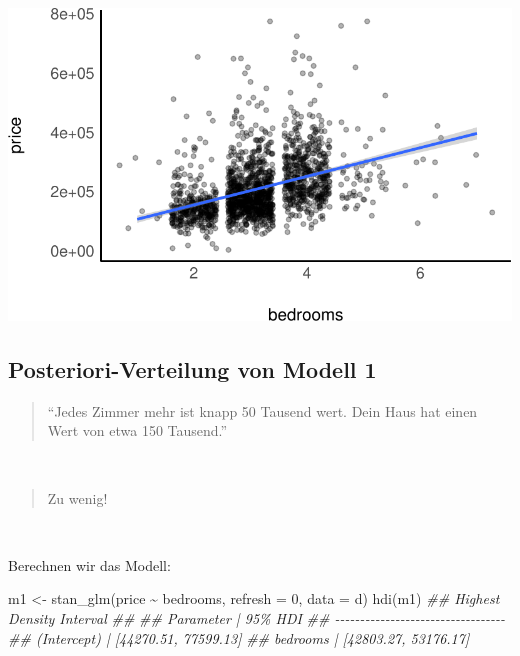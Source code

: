 \documentclass[
  a4paper,
  DIV=11]{scrreprt}
\newenvironment{Shaded}{\begin{snugshade}}{\end{snugshade}}
\newcommand{\AttributeTok}[1]{\textcolor[rgb]{0.40,0.45,0.13}{#1}}
\newcommand{\DecValTok}[1]{\textcolor[rgb]{0.68,0.00,0.00}{#1}}
\newcommand{\DocumentationTok}[1]{\textcolor[rgb]{0.37,0.37,0.37}{\textit{#1}}}
\newcommand{\FunctionTok}[1]{\textcolor[rgb]{0.28,0.35,0.67}{#1}}
\newcommand{\NormalTok}[1]{\textcolor[rgb]{0.00,0.23,0.31}{#1}}
\newcommand{\OtherTok}[1]{\textcolor[rgb]{0.00,0.23,0.31}{#1}}
\newcommand{\SpecialCharTok}[1]{\textcolor[rgb]{0.37,0.37,0.37}{#1}}
\theoremstyle{definition}
\theoremstyle{remark}
\begin{document}
\includegraphics{./kausal_files/figure-pdf/d-plot-don1-1.pdf}

\hypertarget{posteriori-verteilung-von-modell-1}{%
\subsection{Posteriori-Verteilung von Modell
1}\label{posteriori-verteilung-von-modell-1}}

\begin{quote}
``Jedes Zimmer mehr ist knapp 50 Tausend wert. Dein Haus hat einen Wert
von etwa 150 Tausend.''
\end{quote}

👩

\begin{quote}
Zu wenig! 🤬
\end{quote}

🧑

Berechnen wir das Modell:

\begin{Shaded}
\begin{Highlighting}[]
\NormalTok{m1 }\OtherTok{\textless{}{-}} \FunctionTok{stan\_glm}\NormalTok{(price }\SpecialCharTok{\textasciitilde{}}\NormalTok{ bedrooms,}
               \AttributeTok{refresh =} \DecValTok{0}\NormalTok{,}
               \AttributeTok{data =}\NormalTok{ d)}
\FunctionTok{hdi}\NormalTok{(m1)}
\DocumentationTok{\#\# Highest Density Interval}
\DocumentationTok{\#\# }
\DocumentationTok{\#\# Parameter   |              95\% HDI}
\DocumentationTok{\#\# {-}{-}{-}{-}{-}{-}{-}{-}{-}{-}{-}{-}{-}{-}{-}{-}{-}{-}{-}{-}{-}{-}{-}{-}{-}{-}{-}{-}{-}{-}{-}{-}{-}{-}}
\DocumentationTok{\#\# (Intercept) | [44270.51, 77599.13]}
\DocumentationTok{\#\# bedrooms    | [42803.27, 53176.17]}
\end{Highlighting}
\end{Shaded}
\end{document}
